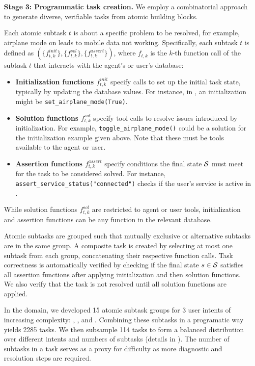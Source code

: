 \textbf{Stage 3: Programmatic task creation.}
We employ a combinatorial approach to generate diverse, verifiable tasks from atomic building blocks.

Each atomic subtask $t$ is about a specific problem to be resolved, for example, airplane mode on leads to mobile data not working. Specifically, each subtask $t$ is defined as $(\{f_{t,k}^{init}\}, \{f_{t,k}^{sol}\}, \{f_{t,k}^{assert}\})$, where $f_{t,k}$ is the $k$-th function call of the subtask $t$ that interacts with the agent's or user's database:
\begin{itemize}
    \setlength\itemsep{0em}
    \item \textbf{Initialization functions $f_{t,k}^{init}$} specify calls to set up the initial task state, typically by updating the database values. For instance, in \telecom, an initialization might be \texttt{set\_airplane\_mode(True)}.
    \item \textbf{Solution functions $f_{t,k}^{sol}$} specify tool calls to resolve issues introduced by initialization. For example, \texttt{toggle\_airplane\_mode()} could be a solution for the initialization example given above. Note that these must be tools available to the agent or user.
    \item \textbf{Assertion functions $f_{t,k}^{assert}$} specify conditions the final state ${\mathcal{S}}$ must meet for the task to be considered solved. For instance, \texttt{assert\_service\_status("connected")} checks if the user's service is active in \telecom.
\end{itemize}

While solution functions $f_{t,k}^{sol}$ are restricted to agent or user tools, initialization and assertion functions can be any function in the relevant database.

Atomic subtasks are grouped such that mutually exclusive or alternative subtasks are in the same group. A composite task is created by selecting at most one subtask from each group, concatenating their respective function calls.
Task correctness is automatically verified by checking if the final state $s \in {\mathcal{S}}$ satisfies all assertion functions after applying initialization and then solution functions. We also verify that the task is not resolved until all solution functions are applied.

In the \telecom domain, we developed 15 atomic subtask groups for 3 user intents of increasing complexity: \serviceissue, \mobiledataissue, and \mmsissue.
Combining these subtasks in a programatic way yields 2285 tasks. We then subsample 114 tasks to form a balanced distribution over different intents and numbers of subtasks (details in ). The number of subtasks in a task serves as a proxy for difficulty as more diagnostic and resolution steps are required.


